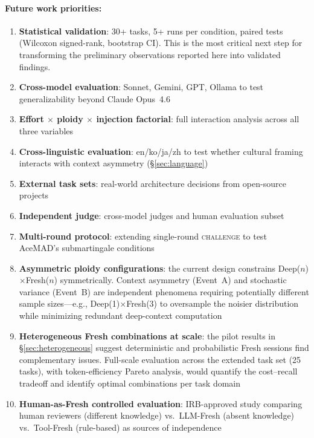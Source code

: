 \documentclass[11pt]{article}
\begin{document}
\paragraph{Future work priorities:}
\begin{enumerate}[label=\arabic*., leftmargin=1.5em]
  \item \textbf{Statistical validation}: 30+ tasks, 5+ runs per condition, paired tests (Wilcoxon signed-rank, bootstrap CI). This is the most critical next step for transforming the preliminary observations reported here into validated findings.
  \item \textbf{Cross-model evaluation}: Sonnet, Gemini, GPT, Ollama to test generalizability beyond Claude Opus~4.6
  \item \textbf{Effort $\times$ ploidy $\times$ injection factorial}: full interaction analysis across all three variables
  \item \textbf{Cross-linguistic evaluation}: en/ko/ja/zh to test whether cultural framing interacts with context asymmetry (\S\ref{sec:language})
  \item \textbf{External task sets}: real-world architecture decisions from open-source projects
  \item \textbf{Independent judge}: cross-model judges and human evaluation subset
  \item \textbf{Multi-round protocol}: extending single-round \textsc{challenge} to test AceMAD's submartingale conditions
  \item \textbf{Asymmetric ploidy configurations}: the current design constrains Deep($n$)$\times$Fresh($n$) symmetrically. Context asymmetry (Event~A) and stochastic variance (Event~B) are independent phenomena requiring potentially different sample sizes---e.g., Deep(1)$\times$Fresh(3) to oversample the noisier distribution while minimizing redundant deep-context computation
  \item \textbf{Heterogeneous Fresh combinations at scale}: the pilot results in \S\ref{sec:heterogeneous} suggest deterministic and probabilistic Fresh sessions find complementary issues. Full-scale evaluation across the extended task set (25 tasks), with token-efficiency Pareto analysis, would quantify the cost--recall tradeoff and identify optimal combinations per task domain
  \item \textbf{Human-as-Fresh controlled evaluation}: IRB-approved study comparing human reviewers (different knowledge) vs.\ LLM-Fresh (absent knowledge) vs.\ Tool-Fresh (rule-based) as sources of independence

\end{enumerate}
\end{document}
